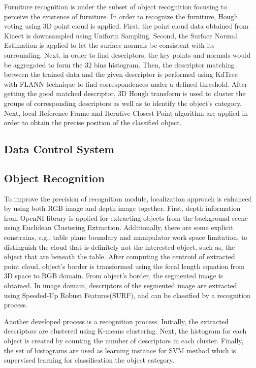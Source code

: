 \documentclass{llncs}
\begin{document}
Furniture recognition is under the subset of object recognition focusing to perceive the existence of furniture. In order to recognize the furniture, Hough voting using 3D point cloud is applied. First, the point cloud data obtained from Kinect is downsampled using Uniform Sampling. Second, the Surface Normal Estimation is applied to let the surface normals be consistent with its surrounding. Next, in order to find descriptors, the key points and normals would be aggregated to form the 32 bins histogram. Then, the descriptor matching between the trained data and the given descriptor is performed using KdTree with FLANN technique to find correspondences under a defined threshold. After getting the good matched descriptor, 3D Hough transform is used to cluster the groups of corresponding descriptors as well as to identify the object's category. Next, local Reference Frame and Iterative Closest Point algorithm are applied in order to obtain the precise position of the classified object.

\subsection{Data Control System}


\subsection{Object Recognition}
    
To improve the precision of recognition module, localization approach is enhanced by using both RGB image and depth image together. First, depth information from OpenNI library is applied for extracting objects from the background scene using Euclidean Clustering Extraction\cite{ece}\cite{rudu.thesis}. Additionally, there are some explicit constrains, e.g., table plane boundary and manipulator work space limitation, to distinguish the cloud that is definitely not the interested object, such as, the object that are beneath the table. After computing the centroid of extracted point cloud, object's border is transformed using the focal length equation from 3D space to RGB domain. From object's border, the segmented image is obtained. In image domain, descriptors of the segmented image are extracted using Speeded-Up Robust Features(SURF), and can be classified by a recognition process.

Another developed process is a recognition process. Initially, the extracted descriptors are clustered using K-means clustering. Next, the histogram for each object is created by counting the number of descriptors in each cluster. Finally, the set of histograms are used as learning instance for SVM method which is supervised learning for classification the object category\cite{obj_rec}.
\end{document}
